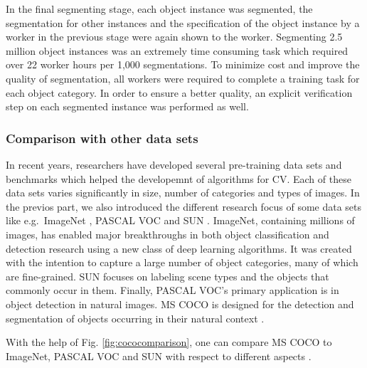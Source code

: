 \documentclass[
]{krantz}
\begin{document}
In the final segmenting stage, each object instance was segmented, the segmentation for other instances and the specification of the object instance by a worker in the previous stage were again shown to the worker. Segmenting 2.5 million object instances was an extremely time consuming task which required over 22 worker hours per 1,000 segmentations. To minimize cost and improve the quality of segmentation, all workers were required to complete a training task for each object category.
In order to ensure a better quality, an explicit verification step on each segmented instance was performed as well.

\hypertarget{comparison-with-other-data-sets}{%
\subsubsection{Comparison with other data sets}\label{comparison-with-other-data-sets}}

In recent years, researchers have developed several pre-training data sets and benchmarks which helped the developemnt of algorithms for CV.
Each of these data sets varies significantly in size, number of categories and types of images.
In the previos part, we also introduced the different research focus of some data sets like e.g.~ImageNet \citep{deng2009imagenet}, PASCAL VOC \citep{pascalvoc} and SUN \citep{sun}.
ImageNet, containing millions of images, has enabled major breakthroughs in both object classification and detection research using a new class of deep learning algorithms. It was created with the intention to capture a large number of object categories, many of which are fine-grained. SUN focuses on labeling scene types and the objects that commonly occur in them. Finally, PASCAL VOC's primary application is in object detection in natural images. MS COCO is designed for the detection and segmentation of objects occurring in their natural context \citep{mccoco}.

With the help of Fig. \ref{fig:cococomparison}, one can compare MS COCO to ImageNet, PASCAL VOC and SUN with respect to different aspects \citep{mccoco}.
\end{document}
